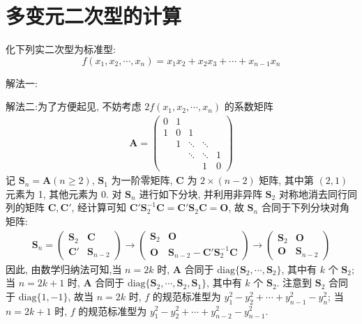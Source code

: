 \documentclass[../../main.tex]{subfiles}%
\begin{document}
\section{多变元二次型的计算}

\begin{example}
化下列实二次型为标准型:
\[f(x_1,x_2,\cdots,x_n)=x_1x_2 + x_2x_3 + \cdots + x_{n - 1}x_n\]
\end{example}
\begin{solution}

{\color{blue}解法一:}

{\color{blue}解法二:}为了方便起见, 不妨考虑 \(2f(x_1,x_2,\cdots,x_n)\) 的系数矩阵
\begin{align*}
\boldsymbol{A} = \begin{pmatrix}
0 & 1 & & & \\
1 & 0 & 1 & & \\
& 1 & \ddots & \ddots & \\
& & \ddots & \ddots & 1 \\
& & & 1 & 0
\end{pmatrix}
\end{align*}
记 \(\boldsymbol{S}_n = \boldsymbol{A}(n\geqslant 2)\), \(\boldsymbol{S}_1\) 为一阶零矩阵, \(\boldsymbol{C}\) 为 \(2\times(n - 2)\) 矩阵, 其中第 \((2,1)\) 元素为 1, 其他元素为 0. 对 \(\boldsymbol{S}_n\) 进行如下分块, 并利用非异阵 \(\boldsymbol{S}_2\) 对称地消去同行同列的矩阵 \(\boldsymbol{C},\boldsymbol{C}'\), 经计算可知 \(\boldsymbol{C}'\boldsymbol{S}_2^{-1}\boldsymbol{C} = \boldsymbol{C}'\boldsymbol{S}_2\boldsymbol{C} = \boldsymbol{O}\), 故 \(\boldsymbol{S}_n\) 合同于下列分块对角矩阵:
\begin{align*}
\boldsymbol{S}_n = \begin{pmatrix}
\boldsymbol{S}_2 & \boldsymbol{C} \\
\boldsymbol{C}' & \boldsymbol{S}_{n - 2}
\end{pmatrix} \to
\begin{pmatrix}
\boldsymbol{S}_2 & \boldsymbol{O} \\
\boldsymbol{O} & \boldsymbol{S}_{n - 2} - \boldsymbol{C}'\boldsymbol{S}_2^{-1}\boldsymbol{C}
\end{pmatrix} \to
\begin{pmatrix}
\boldsymbol{S}_2 & \boldsymbol{O} \\
\boldsymbol{O} & \boldsymbol{S}_{n - 2}
\end{pmatrix}
\end{align*}
因此, 由数学归纳法可知,当 \(n = 2k\) 时, \(\boldsymbol{A}\) 合同于 \(\mathrm{diag}\{\boldsymbol{S}_2,\cdots,\boldsymbol{S}_2\}\), 其中有 \(k\) 个 \(\boldsymbol{S}_2\); 当 \(n = 2k + 1\) 时, \(\boldsymbol{A}\) 合同于 \(\mathrm{diag}\{\boldsymbol{S}_2,\cdots,\boldsymbol{S}_2,\boldsymbol{S}_1\}\), 其中有 \(k\) 个 \(\boldsymbol{S}_2\). 注意到 \(\boldsymbol{S}_2\) 合同于 \(\mathrm{diag}\{1, - 1\}\), 故当 \(n = 2k\) 时, \(f\) 的规范标准型为 \(y_1^2 - y_2^2 + \cdots + y_{n - 1}^2 - y_n^2\); 当 \(n = 2k + 1\) 时, \(f\) 的规范标准型为 \(y_1^2 - y_2^2 + \cdots + y_{n - 2}^2 - y_{n - 1}^2\). 

\end{solution}
\end{document}

